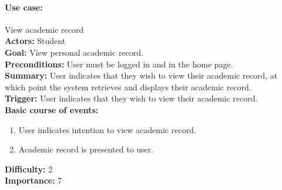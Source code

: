 \documentclass[12pt]{article}
\begin{document}
\paragraph*{Use case:} View academic record\\
\textbf{Actors:} Student\\
\textbf{Goal:} View personal academic record.\\
\textbf{Preconditions:} User must be logged in and in the home page.\\
\textbf{Summary:} User indicates that they wish to view their academic record, at which point the system retrieves and displays their academic record.\\
\textbf{Trigger:} User indicates that they wish to view their academic record.\\
\textbf{Basic course of events:}
\begin{enumerate}
\item User indicates intention to view academic record.
\item Academic record is presented to user.
\end{enumerate}
\textbf{Difficulty:} 2\\
\textbf{Importance:} 7\\
\end{document}
